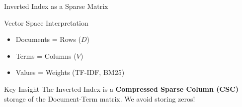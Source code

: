 \documentclass[aspectratio=169]{beamer}
\begin{document}
\begin{frame}[shrink=10]{Inverted Index as a Sparse Matrix}
\begin{block}{Vector Space Interpretation}
\begin{itemize}
    \item Documents = Rows ($D$)
    \item Terms = Columns ($V$)
    \item Values = Weights (TF-IDF, BM25)
\end{itemize}
\end{block}

\begin{center}

\end{center}

\begin{exampleblock}{Key Insight}
The Inverted Index is a \textbf{Compressed Sparse Column (CSC)} storage of the Document-Term matrix. We avoid storing zeros!
\end{exampleblock}
\end{frame}
\end{document}
